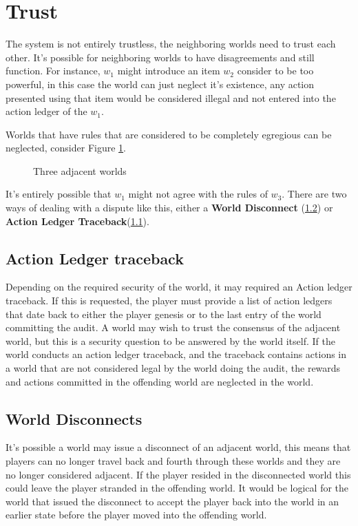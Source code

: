 \documentclass[runningheads,a4paper]{llncs}
\begin{document}
\section{Trust}
The system is not entirely trustless, the neighboring worlds need to trust each other. It's possible for neighboring worlds to have disagreements and still function. For instance, $w_1$ might introduce an item $w_2$ consider to be too powerful, in this case the world can just neglect it's existence, any action presented using that item would be considered illegal and not entered into the action ledger of the $w_1$.

Worlds that have rules that are considered to be completely egregious can be neglected, consider Figure \ref{ThreeWorlds}. 

\begin{figure}
\label{ThreeWorlds}
\caption{Three adjacent worlds}
\begin{center}
\end{center}
\end{figure}

It's entirely possible that $w_1$ might not agree with the rules of $w_3$. There are two ways of dealing with a dispute like this, either a \textbf{World Disconnect} (\ref{WD}) or \textbf{Action Ledger Traceback}(\ref{ALT}).

\subsection{Action Ledger traceback}
\label{ALT}
Depending on the required security of the world, it may required an Action ledger traceback. If this is requested, the player must provide a list of action ledgers that date back to either the player genesis or to the last entry of the world committing the audit. A world may wish to trust the consensus of the adjacent world, but this is a security question to be answered by the world itself. If the world conducts an action ledger traceback, and the traceback contains actions in a world that are not considered legal by the world doing the audit, the rewards and actions committed in the offending world are neglected in the world.

\subsection{World Disconnects}
\label{WD}
It's possible a world may issue a disconnect of an adjacent world, this means that players can no longer travel back and fourth through these worlds and they are no longer considered adjacent. If the player resided in the disconnected world this could leave the player stranded in the offending world. It would be logical for the world that issued the disconnect to accept the player back into the world in an earlier state before the player moved into the offending world. 


\end{document}
